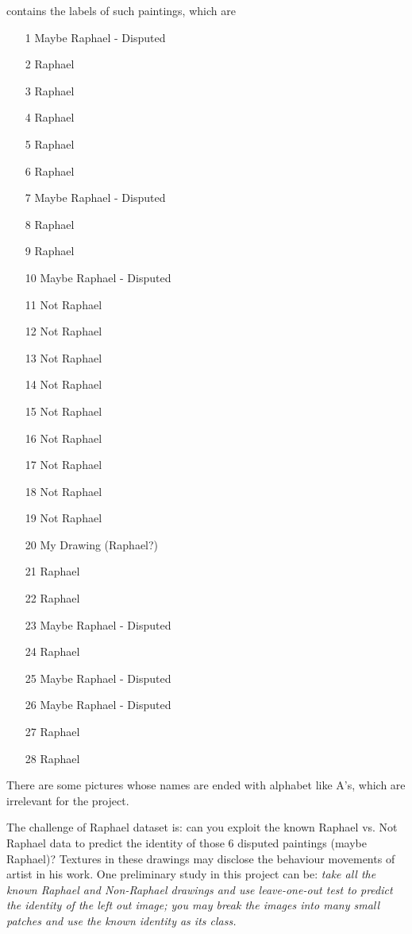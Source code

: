 \documentclass[11pt]{article}
\begin{document}
\noindent contains the labels of such paintings, which are 
\begin{enumerate}
\item[1] Maybe Raphael - Disputed
\item[2] Raphael
\item[3] Raphael
\item[4] Raphael
\item[5] Raphael
\item[6] Raphael
\item[7] Maybe Raphael - Disputed
\item[8] Raphael
\item[9] Raphael
\item[10] Maybe Raphael - Disputed
\item[11] Not Raphael
\item[12] Not Raphael
\item[13] Not Raphael
\item[14] Not Raphael
\item[15] Not Raphael
\item[16] Not Raphael
\item[17] Not Raphael
\item[18] Not Raphael
\item[19] Not Raphael
\item[20] My Drawing (Raphael?)
\item[21] Raphael
\item[22] Raphael
\item[23] Maybe Raphael - Disputed
\item[24] Raphael
\item[25] Maybe Raphael - Disputed
\item[26] Maybe Raphael - Disputed
\item[27] Raphael
\item[28] Raphael
\end{enumerate}
There are some pictures whose names are ended with alphabet like A's, which are irrelevant for the project. 

The challenge of Raphael dataset is: can you exploit the known Raphael vs. Not Raphael data to predict the identity of those 6 disputed paintings (maybe Raphael)? Textures in these drawings may disclose the behaviour movements of artist in his work. One preliminary study in this project can be: \emph{take all the known Raphael and Non-Raphael drawings and use leave-one-out test to predict the identity of the left out image; you may break the images into many small patches and use the known identity as its class.}      
\end{document}

